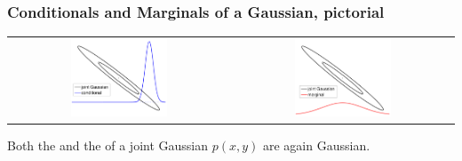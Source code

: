\begin{frame}
\frametitle{Conditionals and Marginals of a Gaussian, pictorial}
\begin{center}
\begin{tabular}{cc}
\includegraphics[width=0.45\textwidth]{gauss02} &
{\includegraphics[width=0.45\textwidth]{gauss03}}
\end{tabular}
\end{center}

Both the  and the 
of a joint Gaussian $p(x,y)$ are again Gaussian.
\end{frame}


